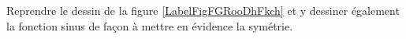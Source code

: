 
\begin{exercice}\label{exoanalyseCTU-0003}

    Reprendre le dessin de la figure \ref{LabelFigFGRooDhFkch} et y dessiner également la fonction sinus de façon à mettre en évidence la symétrie.

\end{exercice}

